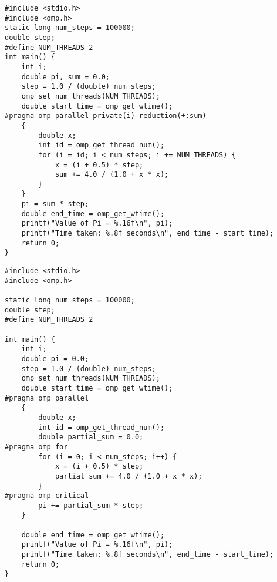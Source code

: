 \documentclass{article}
\begin{document}
\begin{lstlisting}[style=cstyle,caption={并行$\pi$值计算1}]
#include <stdio.h>
#include <omp.h>
static long num_steps = 100000;
double step;
#define NUM_THREADS 2
int main() {
    int i;
    double pi, sum = 0.0;
    step = 1.0 / (double) num_steps;
    omp_set_num_threads(NUM_THREADS);
    double start_time = omp_get_wtime();
#pragma omp parallel private(i) reduction(+:sum)
    {
        double x;
        int id = omp_get_thread_num();
        for (i = id; i < num_steps; i += NUM_THREADS) {
            x = (i + 0.5) * step;
            sum += 4.0 / (1.0 + x * x);
        }
    }
    pi = sum * step;
    double end_time = omp_get_wtime();
    printf("Value of Pi = %.16f\n", pi);
    printf("Time taken: %.8f seconds\n", end_time - start_time);
    return 0;
} 
\end{lstlisting}
\begin{lstlisting}[style=cstyle,caption={并行$\pi$值计算2}]
#include <stdio.h>
#include <omp.h>

static long num_steps = 100000;
double step;
#define NUM_THREADS 2

int main() {
    int i;
    double pi = 0.0;
    step = 1.0 / (double) num_steps;
    omp_set_num_threads(NUM_THREADS);
    double start_time = omp_get_wtime();
#pragma omp parallel
    {
        double x;
        int id = omp_get_thread_num();
        double partial_sum = 0.0;
#pragma omp for
        for (i = 0; i < num_steps; i++) {
            x = (i + 0.5) * step;
            partial_sum += 4.0 / (1.0 + x * x);
        }
#pragma omp critical
        pi += partial_sum * step;
    }

    double end_time = omp_get_wtime();
    printf("Value of Pi = %.16f\n", pi);
    printf("Time taken: %.8f seconds\n", end_time - start_time);
    return 0;
}
    
\end{lstlisting}
\end{document}

